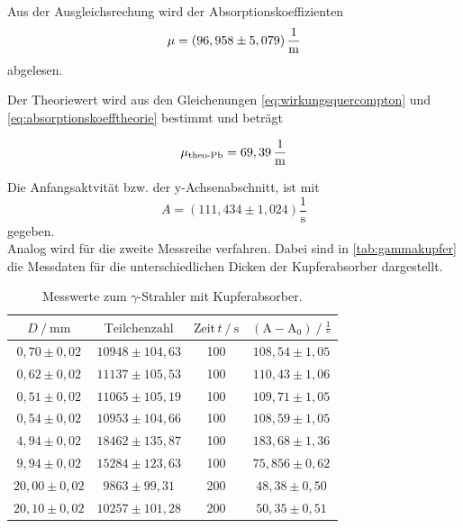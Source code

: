 Aus der Ausgleichsrechung wird der Absorptionskoeffizienten 
\begin{equation*}
    \mu =  \left( 96,958 \pm 5,079 \right) \unit{\dfrac{1}{\meter}}
\end{equation*}
abgelesen.

Der Theoriewert wird aus den Gleichenungen \eqref{eq:wirkungsquercompton} und  \eqref{eq:absorptionskoefftheorie} bestimmt und beträgt

\begin{equation}
    \mu_{\text{theo-Pb}} =  69,39 \, \unit{\dfrac{1}{\meter}}
    \label{eq:absorpttheoPb}
\end{equation}

Die Anfangsaktvität bzw. der y-Achsenabschnitt, ist mit 
\begin{equation*}
    A =  \left( 111,434 \pm 1,024 \right)  \dfrac{1}{\unit{\second}}
\end{equation*}
gegeben. \\

Analog wird für die zweite Messreihe verfahren.
Dabei sind in \autoref{tab:gammakupfer} die Messdaten für die unterschiedlichen Dicken der Kupferabsorber dargestellt.

\begin{table}[H]
    \centering
    \caption{Messwerte zum $\gamma$-Strahler mit Kupferabsorber.}
    \label{tab:gammakupfer}
    \begin{tabular}{S[table-format=2.2] S[table-format=5.0] S[table-format=3.0] S}
      \toprule
      {$D \mathbin{/} \unit{\milli\meter} $} & {$\text{Teilchenzahl}$} & {$\text{Zeit} \,t \mathbin{/} \unit{\second}$} &{$ \left(\text{A}- \text{A}_0 \right) \mathbin{/} \unit{\frac{1}{\second}}$} \\
      \midrule
      {$ 0,70 \pm 0,02$}          &    {$  10948 \pm 104,63    $} &      100  	& {$108,54  \pm 1,05$} \\
      {$ 0,62 \pm 0,02$}          &    {$  11137 \pm 105,53    $} &      100  	& {$110,43  \pm 1,06$} \\
      {$ 0,51 \pm 0,02$}          &    {$  11065 \pm 105,19    $} &      100  	& {$109,71  \pm 1,05$} \\
      {$ 0,54 \pm 0,02$}          &    {$  10953 \pm 104,66    $} &      100  	& {$108,59  \pm 1,05$} \\
      {$ 4,94 \pm 0,02$}          &    {$  18462 \pm 135,87    $} &      100  	& {$183,68  \pm 1,36$} \\
      {$ 9,94 \pm 0,02$}          &    {$  15284 \pm 123,63    $} &      100  	& {$75,856  \pm 0,62$} \\
      {$20,00 \pm 0,02$}          &    {$   9863 \pm 99,31     $} &      200  	& {$ 48,38  \pm 0,50$} \\
      {$20,10 \pm 0,02$}          &    {$  10257 \pm 101,28    $} &      200  	& {$ 50,35  \pm 0,51$} \\
      \bottomrule
    \end{tabular}
  \end{table}

